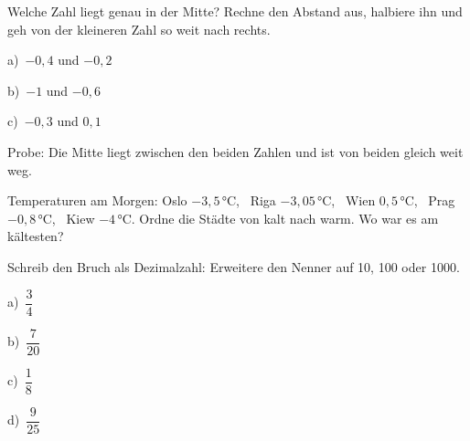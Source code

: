 \documentclass[11pt]{article}
\newcommand{\aufg}[3]{\par\noindent\makebox[0pt][r]{#3}\begin{minipage}[t]{\linewidth}#1\end{minipage}\par}
\newcommand{\nr}[1]{\makebox[7mm][l]{\textbf{#1}}}
\begin{document}
\medskip
\aufg{\nr{B3}\begin{minipage}[t]{\dimexpr\linewidth-7mm\relax}Welche Zahl liegt genau in der Mitte? Rechne den Abstand aus, halbiere ihn und geh von der kleineren Zahl so weit nach rechts.\par\smallskip
\noindent\begin{minipage}[t]{0.48\linewidth}\raggedright
a)\ $-0{,}4$ und $-0{,}2$
\end{minipage}\hfill
\begin{minipage}[t]{0.48\linewidth}\raggedright
b)\ $-1$ und $-0{,}6$
\end{minipage}\par\smallskip
\noindent\begin{minipage}[t]{0.48\linewidth}\raggedright
c)\ $-0{,}3$ und $0{,}1$
\end{minipage}\par\smallskip
\par{\small Probe: Die Mitte liegt zwischen den beiden Zahlen und ist von beiden gleich weit weg.}\end{minipage}}{}{}
\medskip
\aufg{\nr{B4}Temperaturen am Morgen: Oslo $-3{,}5$\,°C, \ Riga $-3{,}05$\,°C, \ Wien $0{,}5$\,°C, \ Prag $-0{,}8$\,°C, \ Kiew $-4$\,°C. Ordne die Städte von kalt nach warm. Wo war es am kältesten?}{}{{\scriptsize\color{mbgrau}Ziel\hspace{2mm}}}
\medskip
\par\Needspace{25mm}\noindent\colorbox{black!12}{}\hspace{2mm}{\bfseries Bruch und Prozent: erst umwandeln}\par\smallskip
\aufg{\nr{C1}\begin{minipage}[t]{\dimexpr\linewidth-7mm\relax}Schreib den Bruch als Dezimalzahl: Erweitere den Nenner auf 10, 100 oder 1000.\par\smallskip
\noindent\begin{minipage}[t]{0.48\linewidth}\raggedright
a)\ $\dfrac{3}{4}$
\end{minipage}\hfill
\begin{minipage}[t]{0.48\linewidth}\raggedright
b)\ $\dfrac{7}{20}$
\end{minipage}\par\smallskip
\noindent\begin{minipage}[t]{0.48\linewidth}\raggedright
c)\ $\dfrac{1}{8}$
\end{minipage}\hfill
\begin{minipage}[t]{0.48\linewidth}\raggedright
d)\ $\dfrac{9}{25}$
\end{minipage}\par\smallskip\end{minipage}}{}{}
\end{document}
